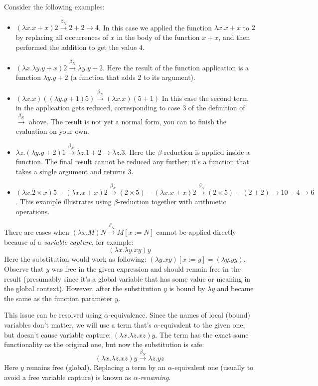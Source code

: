 \documentclass{article}
\newcommand{\lam}{\lambda}
\newcommand{\cbnb}{\overset{\beta_{N}}{\rightarrow}}
\begin{document}
Consider the following examples:
\begin{itemize}
\item $(\lam x. x + x) 2 \cbnb 2 + 2 \rightarrow 4$. In this case we applied the function $\lam x. x + x$ to $2$ by replacing all occurrences of $x$ in the body of the function $x + x$, and then performed the addition to get the value $4$. 
\item $(\lam x. \lam y. y + x) 2 \cbnb \lam y. y + 2$. Here the result of the function application is a function $\lam y. y + 2$ (a function that adds 2 to its argument).
\item  $(\lam x. x)((\lam y. y + 1) 5) \cbnb (\lam x. x) (5 + 1)$ In this case the second term in the application gets reduced, corresponding to case 3 of the definition of $\cbnb$ above. The result is not yet a normal form, you can to finish the evaluation on your own.
\item $\lam z. (\lam y. y + 2) 1 \cbnb \lam z. 1 + 2 \rightarrow \lam z. 3$. Here the $\beta$-reduction is applied inside a function. The final result cannot be reduced any further; it's a function that takes a single argument and returns $3$.
\item $(\lam x. 2 \times x) 5 - (\lam x. x + x) 2 \cbnb (2 \times 5) -  (\lam x. x + x) 2 \cbnb (2 \times 5) - (2 + 2) \rightarrow 10 - 4 \rightarrow 6$. This example illustrates using $\beta$-reduction together with arithmetic operations. 
\end{itemize}

There are cases when $(\lam x. M) N \cbnb M [ x := N]$ cannot be applied directly because of a \textit{variable capture}, for example:
$$
(\lam x. \lam y.  x y) y
$$
Here the substitution would work as following: $(\lam y.  x y) [x := y] = (\lam y. y y)$. Observe that $y$ was free in the given expression and should remain free in the result (presumably since it's a global variable that has some value or meaning in the global context). However, after the substitution $y$ is bound by $\lam y$ and became the same as the function parameter $y$. 

This issue can be resolved using $\alpha$-equivalence. Since the names of local (bound) variables don't matter, we will use a term that's $\alpha$-equivalent to the given one, but doesn't cause variable capture: $(\lam x. \lam z.  x z) y$. The term has the exact same functionality as the original one, but now the substitution is safe:
$$
(\lam x. \lam z.  x z) y \cbnb \lam z. y z
$$
Here $y$ remains free (global). Replacing a term by an $\alpha$-equivalent one (usually to avoid a free variable capture) is known as \textit{$\alpha$-renaming}.      
\end{document}
